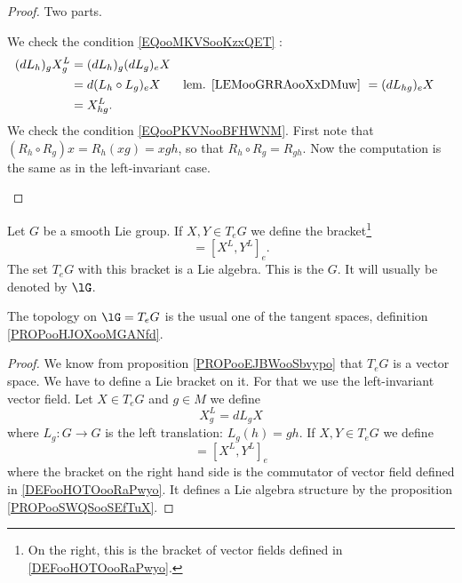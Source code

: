 \begin{proof}
	Two parts.
	\begin{subproof}
		We check the condition \eqref{EQooMKVSooKzxQET} :
		\begin{subequations}
			\begin{align}
				(dL_h)_gX_g^L & =(dL_h)_g(dL_g)_eX                                         \\
				              & =d(L_h\circ L_g)_eX & \text{lem. \ref{LEMooGRRAooXxDMuw}}\
				              & =(dL_{hg})_eX                                              \\
				              & =X^L_{hg}.
			\end{align}
		\end{subequations}
		We check the condition \eqref{EQooPKVNooBFHWNM}. First note that \( (R_h\circ R_g)x=R_h(xg)=xgh\), so that \( R_h\circ R_g=R_{gh}\). Now the computation is the same as in the left-invariant case.
	\end{subproof}
\end{proof}

\begin{propositionDef}      \label{DEFooKDCPooZOJsMD}
	Let \( G\) be a smooth Lie group. If \( X,Y\in T_eG\) we define the bracket\footnote{On the right, this is the bracket of vector fields defined in \ref{DEFooHOTOooRaPwyo}.}
	\begin{equation}
		[X,Y] = [X^L,Y^L]_e.
	\end{equation}
	The set \( T_eG\) with this bracket is a Lie algebra. This is the  \( G\). It will usually be denoted by \( \lG\).

	The topology on \( \lG=T_eG\) is the usual one of the tangent spaces, definition \ref{PROPooHJOXooMGANfd}.
\end{propositionDef}

\begin{proof}
	We know from proposition \ref{PROPooEJBWooSbvypo} that \( T_eG\) is a vector space. We have to define a Lie bracket on it. For that we use the left-invariant vector field. Let \( X\in T_eG\) and \( g\in M\) we define
	\begin{equation}
		X^L_g=dL_gX
	\end{equation}
	where \( L_g\colon G\to G\) is the left translation: \( L_g(h)=gh\). If \( X,Y\in T_eG\) we define
	\begin{equation}
		[X,Y]=[X^L,Y^L]_e
	\end{equation}
	where the bracket on the right hand side is the commutator of vector field defined in \ref{DEFooHOTOooRaPwyo}. It defines a Lie algebra structure by the proposition \ref{PROPooSWQSooSEfTuX}.
\end{proof}

